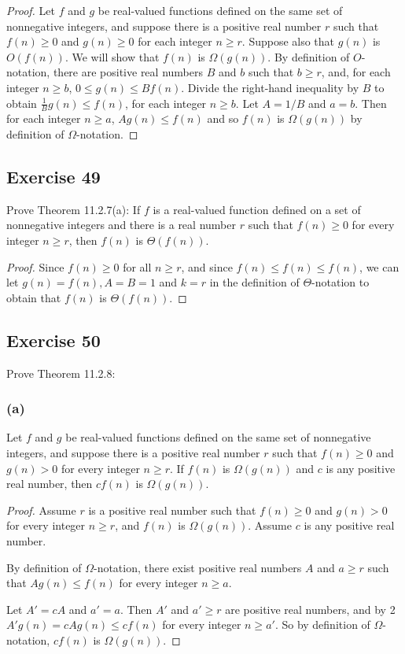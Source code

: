 \documentclass[14pt]{extarticle}
\newcommand{\dps}{\displaystyle}
\begin{document}
\begin{proof}
    Let \(f\) and \(g\) be real-valued functions defined on the same set of nonnegative integers, and suppose there is a
    positive real number \(r\) such that \(f(n) \geq 0\) and \(g(n) \geq 0\) for each integer \(n \geq r\). Suppose also
    that \(g(n)\) is \(O(f(n))\). We will show that \(f(n)\) is \(\Omega(g(n))\). By definition of \(O\)-notation, there are
    positive real numbers \(B\) and \(b\) such that \(b \geq r\), and, for each integer \(n \geq b\), \(0 \leq g(n)\leq Bf(n)\).
    Divide the right-hand inequality by \(B\) to obtain \(\dps \frac{1}{B} g(n) \leq f(n)\), for each integer \(n \geq b\).
    Let \(A = 1/B\) and \(a = b\). Then for each integer \(n \geq a\), \(Ag(n) \leq f(n)\) and so \(f(n)\) is \(\Omega(g(n))\)
    by definition of \(\Omega\)-notation.
\end{proof}

\subsection{Exercise 49}
Prove Theorem 11.2.7(a): If \(f\) is a real-valued function defined on a set of nonnegative integers and there is a real
number \(r\) such that \(f(n) \geq 0\) for every integer \(n \geq r\), then \(f(n)\) is \(\Theta(f(n))\).

\begin{proof}
    Since \(f(n) \geq 0\) for all \(n \geq r\), and since \(f(n) \leq f(n) \leq f(n)\), we can let \(g(n) = f(n), A = B = 1\)
    and \(k = r\) in the definition of \(\Theta\)-notation to obtain that \(f(n)\) is \(\Theta(f(n))\).
\end{proof}

\subsection{Exercise 50}
Prove Theorem 11.2.8:

\subsubsection{(a)}
Let \(f\) and \(g\) be real-valued functions defined on the same set of nonnegative integers, and suppose there is a
positive real number \(r\) such that \(f(n) \geq 0\) and \(g(n) > 0\) for every integer \(n \geq r\). If \(f(n)\) is
\(\Omega(g(n))\) and \(c\) is any positive real number, then \(cf(n)\) is \(\Omega(g(n))\).

\begin{proof}
    Assume \(r\) is a positive real number such that \(f(n) \geq 0\) and \(g(n) > 0\) for every integer \(n \geq r\), and
    \(f(n)\) is \(\Omega(g(n))\). Assume \(c\) is any positive real number.

    By definition of \(\Omega\)-notation, there exist positive real numbers \(A\) and \(a \geq r\) such that \(Ag(n) \leq
    f(n)\) for every integer \(n \geq a\).

    Let \(A' = cA\) and \(a' = a\). Then \(A'\) and \(a' \geq r\) are positive real numbers, and by 2 \(A'g(n) = cAg(n) \leq
    cf(n)\) for every integer \(n \geq a'\). So by definition of \(\Omega\)-notation, \(cf(n)\) is \(\Omega(g(n))\).
\end{proof}
\end{document}
